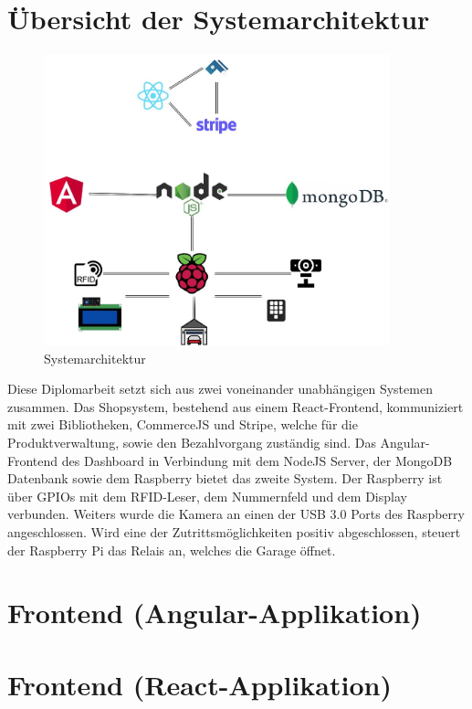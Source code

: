 \section{Übersicht der Systemarchitektur}
\begin{figure}[h]
    \centering
    \includegraphics[width=10cm]{pics/APERTASystemarchitektur.jpg}
    \caption{Systemarchitektur}
    \end{figure}
Diese Diplomarbeit setzt sich aus zwei voneinander unabhängigen Systemen zusammen. Das Shopsystem, bestehend aus einem React-Frontend, kommuniziert mit zwei Bibliotheken, CommerceJS und Stripe, welche für die Produktverwaltung, sowie den Bezahlvorgang zuständig sind. Das Angular-Frontend des Dashboard in Verbindung mit dem NodeJS Server, der MongoDB Datenbank sowie dem Raspberry bietet das zweite System.
Der Raspberry ist über GPIOs mit dem RFID-Leser, dem Nummernfeld und dem Display verbunden. Weiters wurde die Kamera an einen der USB 3.0 Ports des Raspberry angeschlossen. Wird eine der Zutrittsmöglichkeiten positiv abgeschlossen, steuert der Raspberry Pi das Relais an, welches die Garage öffnet.
\section{Frontend (Angular-Applikation)}

\section{Frontend (React-Applikation)}
